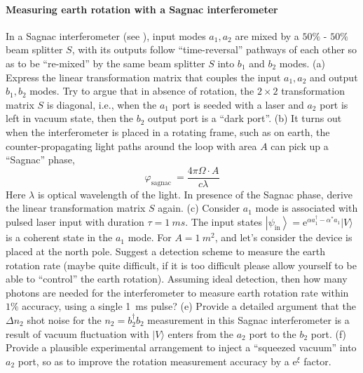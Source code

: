 \documentclass[hyperref, a4paper]{article}
\newcommand*{\ee}{\mathrm{e}}
\begin{document}
\paragraph{}

\paragraph{Measuring earth rotation with a Sagnac interferometer} In a Sagnac interferometer (see ), input modes ${a}_{1}, {a}_{2}$ are mixed by a $50 \%$ - $50 \%$ beam splitter $S$, with its outputs follow ``time-reversal'' pathways of each other so as to be ``re-mixed'' by the same beam splitter $S$ into ${b}_{1}$ and ${b}_{2}$ modes.
(a) Express the linear transformation matrix that couples the input $a_{1}, a_{2}$ and output ${b}_{1}, {b}_{2}$ modes. Try to argue that in absence of rotation, the $2 \times 2$ transformation matrix ${S}$ is diagonal, i.e., when the $a_1$ port is seeded with a laser and $a_2$ port is left in vacuum state, then the $b_2$ output port is a ``dark port''.
(b) It turns out when the interferometer is placed in a rotating frame, such as on earth, the counter-propagating light paths around the loop with area $A$ can pick up a ``Sagnac'' phase,
\[
\varphi_{\text {sagnac }}=\frac{4 \pi \Omega \cdot A}{c \lambda}
\]
Here $\lambda$ is optical wavelength of the light. In presence of the Sagnac phase, derive the linear transformation matrix ${S}$ again.
(c) Consider $a_{1}$ mode is associated with pulsed laser input with duration $\tau=\SI{1}{ms}$.
The input states $\left|\psi_{\text{in}}\right\rangle=\ee^{\alpha a_{1}^{\dagger}-\alpha^{*} a_{1}}|V\rangle$ is a coherent state in the $a_{1}$ mode. For ${A}=\SI{1}{m^2}$, and let's consider the device is placed at the north pole. Suggest a detection scheme to measure the earth rotation rate (maybe quite difficult, if it is too difficult please allow yourself to be able to ``control'' the earth rotation). Assuming ideal detection, then how many photons are needed for the interferometer to measure earth rotation rate within $1 \%$ accuracy, using a single \SI{1}{ms} pulse?
(e) Provide a detailed argument that the $\Delta {n}_{2}$ shot noise for the ${n}_{2}=b_{2}^{\dagger} b_{2}$ measurement in this Sagnac interferometer is a result of vacuum fluctuation with $|V\rangle$ enters from the $a_{2}$ port to the $b_{2}$ port.
(f) Provide a plausible experimental arrangement to inject a ``squeezed vacuum'' into $a_{2}$ port, so as to improve the rotation measurement accuracy by a $\mathrm{e}^{\xi}$ factor.
\end{document}
